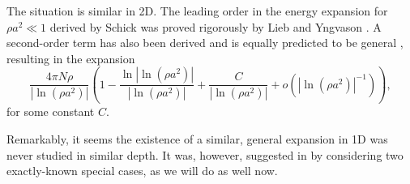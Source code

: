 \documentclass[a4paper,11pt]{article}
\newcommand{\abs}[1]{\left\lvert #1 \right\rvert}
\numberwithin{equation}{section}
\begin{document}
The situation is similar in 2D. The leading order in the energy expansion for $\rho a^2\ll1$ derived by Schick \cite{schick1971two} was proved rigorously by Lieb and Yngvason \cite{lieb2001ground}. A second-order term has also been derived and is equally predicted to be general \cite{andersen2002ground,mora2009ground,fournais2019ground}, resulting in the expansion
\begin{equation}
\label{result2D}
\frac{4\pi N\rho}{\abs{\ln(\rho a^2)}}\left(1-\frac{\ln{\abs{\ln(\rho a^2)}}}{\abs{\ln(\rho a^2)}}+\frac{C}{\abs{\ln(\rho a^2)}}+o\left(\abs{\ln(\rho a^2)}^{-1}\right)\right),
\end{equation}
for some constant $C$.

Remarkably, it seems the existence of a similar, general expansion in 1D was never studied in similar depth. It was, however, suggested in \cite{astrakharchik2010low} by considering two exactly-known special cases, as we will do as well now.
\end{document}
